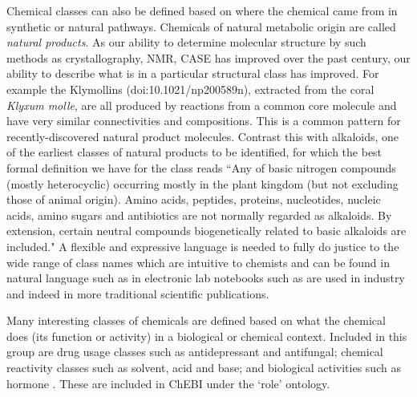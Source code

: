 \documentclass[10pt]{bmc_article}
\newenvironment{bmcformat}{\baselineskip20pt\sloppy\setboolean{publ}{false}}{\baselineskip20pt\sloppy}
\begin{document}
\begin{bmcformat}
Chemical classes can also be defined based on where the chemical came from in synthetic or natural pathways. Chemicals of natural metabolic origin are called \textit{natural products}.  As our ability to determine molecular structure by such methods as crystallography, NMR, CASE has improved over the past century, our ability to describe what is in a particular structural class has improved.  For example the Klymollins (doi:10.1021/np200589n), extracted from the coral \textit{Klyxum molle},
are all produced by reactions from a common core molecule and have very similar connectivities and compositions. This is a common pattern for recently-discovered natural product molecules.  Contrast this with alkaloids, one of the earliest classes of natural products to be identified, for which the best formal definition we have for the class reads ``Any of basic nitrogen compounds (mostly heterocyclic) occurring mostly in the plant kingdom (but not excluding those of animal origin). Amino acids, peptides, proteins, nucleotides, nucleic acids, amino sugars and antibiotics are not normally regarded as alkaloids. By extension, certain neutral compounds biogenetically related to basic alkaloids are included." A flexible and expressive language is needed to fully do justice to the wide range of class names which are intuitive to chemists and can be found in natural language such as in electronic lab notebooks such as are used in industry and indeed in more traditional scientific publications. 

Many interesting classes of chemicals are defined based on what the chemical does (its function or activity) in a biological or chemical context. Included in this group are drug usage classes such as antidepressant and antifungal; chemical reactivity classes such as solvent, acid and base; and biological activities such as hormone \cite{batchelor2010}. These are included in ChEBI under the `role' ontology. 



\end{bmcformat}
\end{document}
